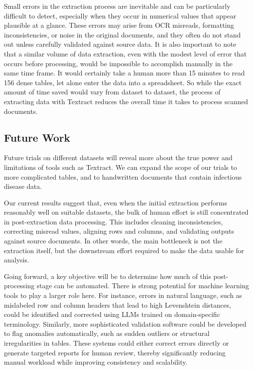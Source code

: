 \documentclass[12pt]{article}
\begin{document}
Small errors in the extraction process are inevitable and can be particularly difficult to detect, especially when they occur in numerical values that appear plausible at a glance. These errors may arise from OCR misreads, formatting inconsistencies, or noise in the original documents, and they often do not stand out unless carefully validated against source data. It is also important to note that a similar volume of data extraction, even with the modest level of error that occurs before processing, would be impossible to accomplish manually in the same time frame. It would certainly take a human more than 15 minutes to read 156 dense tables, let alone enter the data into a spreadsheet. So while the exact amount of time saved would vary from dataset to dataset, the process of extracting data with Textract reduces the overall time it takes to process scanned documents.

\subsection{Future Work}

Future trials on different datasets will reveal more about the true power and limitations of tools such as Textract. We can expand the scope of our trials to more complicated tables, and to handwritten documents that contain infectious disease data.

Our current results suggest that, even when the initial extraction performs reasonably well on suitable datasets, the bulk of human effort is still concentrated in post-extraction data processing. This includes cleaning inconsistencies, correcting misread values, aligning rows and columns, and validating outputs against source documents. In other words, the main bottleneck is not the extraction itself, but the downstream effort required to make the data usable for analysis.

Going forward, a key objective will be to determine how much of this post-processing stage can be automated. There is strong potential for machine learning tools to play a larger role here. For instance, errors in natural language, such as mislabeled row and column headers that lead to high Levenshtein distances, could be identified and corrected using LLMs trained on domain-specific terminology. Similarly, more sophisticated validation software could be developed to flag anomalies automatically, such as sudden outliers or structural irregularities in tables. These systems could either correct errors directly or generate targeted reports for human review, thereby significantly reducing manual workload while improving consistency and scalability.



\clearpage
\printbibliography 
\end{document}
